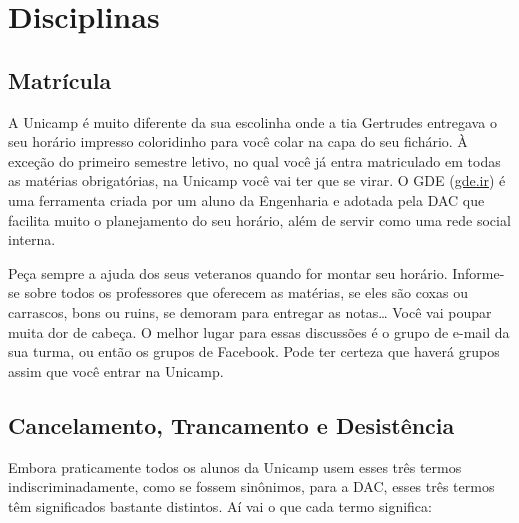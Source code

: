 
\section{Disciplinas}

\subsection{Matrícula}

A Unicamp é muito diferente da sua escolinha onde a tia Gertrudes entregava o
seu horário impresso coloridinho para você colar na capa do seu fichário.  À
exceção do primeiro semestre letivo, no qual você já entra matriculado em todas
as matérias obrigatórias, na Unicamp você vai ter que se virar.  O GDE
(\url{gde.ir}) é uma ferramenta criada por um aluno da Engenharia e adotada pela
DAC que facilita muito o planejamento do seu horário, além de servir como uma
rede social interna.

Peça sempre a ajuda dos seus veteranos quando for montar seu horário. Informe-se
sobre todos os professores que oferecem as matérias, se eles são coxas ou
carrascos, bons ou ruins, se demoram para entregar as notas{\dots} Você vai
poupar muita dor de cabeça. O melhor lugar para essas discussões é o grupo de
e-mail da sua turma, ou então os grupos de Facebook. Pode ter certeza que haverá
grupos assim que você entrar na Unicamp.

\subsection{Cancelamento, Trancamento e Desistência}

Embora praticamente todos os alunos da Unicamp usem esses três termos
indiscriminadamente, como se fossem sinônimos, para a DAC, esses três termos têm
significados bastante distintos. Aí vai o que cada termo significa:

